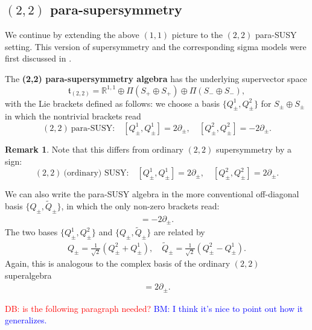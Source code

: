 \documentclass{article}
\newcommand{\RR}{\mathbb{R}}
\newcommand{\p}{\partial}
\newcommand{\wtl}{\widetilde}
\theoremstyle{definition}
\newtheorem{remark}[theorem]{Remark}
\theoremstyle{remark}
\def\brian{\textcolor{blue}{BM: }\textcolor{blue}}
\def\david{\textcolor{red}{DB: }\textcolor{red}}
\begin{document}
\subsection{$(2,2)$ para-supersymmetry}\label{sec:(2,2)parasusy}
We continue by extending the above $(1,1)$ picture to the $(2,2)$ para-SUSY setting. This version of supersymmetry and the corresponding sigma models were first discussed in \cite{HullTwistedSUSY}.

The {\bf (2,2) para-supersymmetry algebra} has the underlying supervector space
\[
\mathfrak{t}_{(2,2)} = \RR^{1,1} \oplus \Pi(S_+ \oplus S_+) \oplus \Pi(S_- \oplus S_-),
\]
with the Lie brackets defined as follows: we choose a basis $\{Q^1_{\pm}, Q^2_\pm\}$ for $S_\pm \oplus S_\pm$ in which the nontrivial brackets read 
\begin{equation}\label{eq:(2,2)para}
(2,2)\ \text{para-SUSY:}\quad [Q_\pm^1, Q_\pm^1] = 2 \partial_{\pm}, \quad [Q_{\pm}^2, Q_{\pm}^2] = -2 \partial_{\pm} .
\end{equation}

\begin{remark}
Note that this differs from ordinary $(2,2)$ supersymmetry by a sign:
\begin{equation*}
(2,2)\ \text{(ordinary) SUSY:}\quad [Q_\pm^1, Q_\pm^1] = 2 \partial_{\pm}, \quad [Q_{\pm}^2, Q_{\pm}^2] = 2 \partial_{\pm} .
\end{equation*}
\end{remark}

We can also write the para-SUSY algebra in the more conventional off-diagonal basis $\{{Q}_\pm,\wtl{Q}_\pm\}$, in which the only non-zero brackets read:
\begin{align*}
[{Q}_\pm,\wtl{Q}_\pm]=-2\p_\pm.
\end{align*}
The two bases $\{Q^1_{\pm}, Q^2_\pm\}$ and $\{{Q}_\pm,\wtl{Q}_\pm\}$ are related by
\begin{align*}
Q_\pm=\frac{1}{\sqrt{2}}(Q^2_\pm+Q^1_\pm),\quad \wtl{Q}_\pm=\frac{1}{\sqrt{2}}(Q^2_\pm-Q^1_\pm).
\end{align*}
Again, this is analogous to the complex basis of the ordinary $(2,2)$ superalgebra
\begin{align*}
[Q_\pm,\overline{Q}_\pm]=2\p_\pm.
\end{align*}

\david{is the following paragraph needed?}
\brian{I think it's nice to point out how it  generalizes.}
\end{document}
